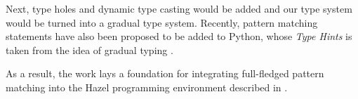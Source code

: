 \documentclass[acmsmall,screen,review,nonacm]{acmart}
\theoremstyle{slplain}
\numberwithin{thm}{section}
\begin{document}
Next, type holes and dynamic type casting would be added and our type system would be turned into a gradual type system.
Recently, pattern matching statements have also been proposed to be added to \textsf{Python}, whose \emph{Type Hints} is taken from the idea of gradual typing \cite{pep484,pep622,Siek2006}.

As a result, the work lays a foundation for integrating full-fledged pattern matching into the \textsf{Hazel} programming environment described in \citet{DBLP:journals/pacmpl/OmarVCH19}.

\clearpage



\end{document}
